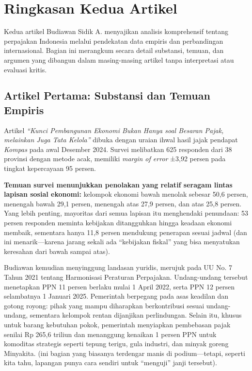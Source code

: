 \section{Ringkasan Kedua Artikel}
\label{sec:Ringkasan}
\setlength{\parskip}{0pt}
\raggedbottom

Kedua artikel Budiawan Sidik A. menyajikan analisis komprehensif tentang perpajakan Indonesia melalui pendekatan data empiris dan perbandingan internasional. Bagian ini merangkum secara detail substansi, temuan, dan argumen yang dibangun dalam masing-masing artikel tanpa interpretasi atau evaluasi kritis.

\subsection{Artikel Pertama: Substansi dan Temuan Empiris}

Artikel \textit{``Kunci Pembangunan Ekonomi Bukan Hanya soal Besaran Pajak, melainkan Juga Tata Kelola''} dibuka dengan uraian ihwal hasil jajak pendapat \textit{Kompas} pada awal Desember 2024. Survei melibatkan 625 responden dari 38 provinsi dengan metode acak, memiliki \textit{margin of error} ±3,92 persen pada tingkat kepercayaan 95 persen.

\textbf{Temuan survei menunjukkan penolakan yang relatif seragam lintas lapisan sosial ekonomi:} kelompok ekonomi bawah menolak sebesar 50,6 persen, menengah bawah 29,1 persen, menengah atas 27,9 persen, dan atas 25,8 persen. Yang lebih penting, mayoritas dari semua lapisan itu menghendaki penundaan: 53 persen responden meminta kebijakan ditangguhkan hingga keadaan ekonomi membaik, sementara hanya 11,8 persen mendukung penerapan sesuai jadwal (dan ini menarik—karena jarang sekali ada “kebijakan fiskal” yang bisa menyatukan keresahan dari bawah sampai atas).

Budiawan kemudian menyinggung landasan yuridis, merujuk pada UU No. 7 Tahun 2021 tentang Harmonisasi Peraturan Perpajakan. Undang-undang tersebut menetapkan PPN 11 persen berlaku mulai 1 April 2022, serta PPN 12 persen selambatnya 1 Januari 2025. Pemerintah berpegang pada asas keadilan dan gotong royong: pihak yang mampu diharapkan berkontribusi sesuai undang-undang, sementara kelompok rentan dijanjikan perlindungan. Selain itu, khusus untuk barang kebutuhan pokok, pemerintah menyiapkan pembebasan pajak senilai Rp 265,6 triliun dan menanggung kenaikan 1 persen PPN untuk komoditas strategis seperti tepung terigu, gula industri, dan minyak goreng Minyakita. (ini bagian yang biasanya terdengar manis di podium—tetapi, seperti kita tahu, lapangan punya cara sendiri untuk ``menguji'' janji tersebut).


